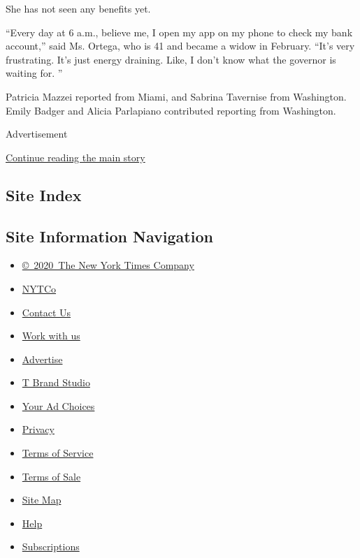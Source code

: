 She has not seen any benefits yet.

``Every day at 6 a.m., believe me, I open my app on my phone to check my
bank account,'' said Ms. Ortega, who is 41 and became a widow in
February. ``It's very frustrating. It's just energy draining. Like, I
don't know what the governor is waiting for. ''

Patricia Mazzei reported from Miami, and Sabrina Tavernise from
Washington. Emily Badger and Alicia Parlapiano contributed reporting
from Washington.

Advertisement

\protect\hyperlink{after-bottom}{Continue reading the main story}

\hypertarget{site-index}{%
\subsection{Site Index}\label{site-index}}

\hypertarget{site-information-navigation}{%
\subsection{Site Information
Navigation}\label{site-information-navigation}}

\begin{itemize}
\tightlist
\item
  \href{https://help.nytimes.com/hc/en-us/articles/115014792127-Copyright-notice}{©~2020~The
  New York Times Company}
\end{itemize}

\begin{itemize}
\tightlist
\item
  \href{https://www.nytco.com/}{NYTCo}
\item
  \href{https://help.nytimes.com/hc/en-us/articles/115015385887-Contact-Us}{Contact
  Us}
\item
  \href{https://www.nytco.com/careers/}{Work with us}
\item
  \href{https://nytmediakit.com/}{Advertise}
\item
  \href{http://www.tbrandstudio.com/}{T Brand Studio}
\item
  \href{https://www.nytimes.com/privacy/cookie-policy\#how-do-i-manage-trackers}{Your
  Ad Choices}
\item
  \href{https://www.nytimes.com/privacy}{Privacy}
\item
  \href{https://help.nytimes.com/hc/en-us/articles/115014893428-Terms-of-service}{Terms
  of Service}
\item
  \href{https://help.nytimes.com/hc/en-us/articles/115014893968-Terms-of-sale}{Terms
  of Sale}
\item
  \href{https://spiderbites.nytimes.com}{Site Map}
\item
  \href{https://help.nytimes.com/hc/en-us}{Help}
\item
  \href{https://www.nytimes.com/subscription?campaignId=37WXW}{Subscriptions}
\end{itemize}
